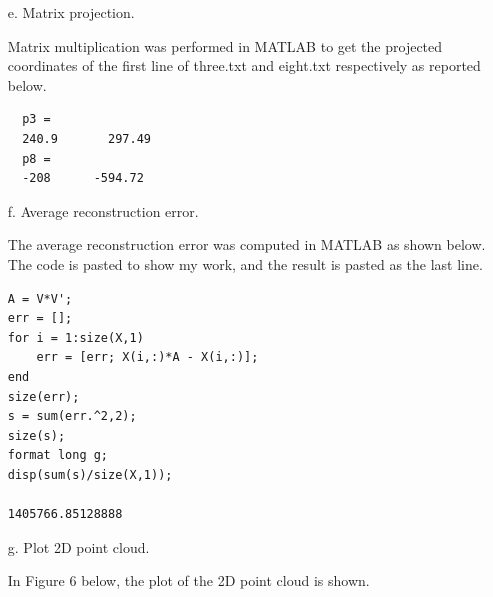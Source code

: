 \documentclass[12pt]{report}
\begin{document}
\begin{enumerate}
\item[e.] Matrix projection.

  Matrix multiplication was performed in MATLAB to get the projected coordinates
  of the first line of three.txt and eight.txt respectively as reported below.

\begin{verbatim}
  p3 =
  240.9       297.49
  p8 =
  -208      -594.72
\end{verbatim}

  \newpage

\item[f.] Average reconstruction error.

  The average reconstruction error was computed in MATLAB as shown below. The
  code is pasted to show my work, and the result is pasted as the last line.

\begin{verbatim}
A = V*V';
err = [];
for i = 1:size(X,1)
    err = [err; X(i,:)*A - X(i,:)];
end
size(err);
s = sum(err.^2,2);
size(s);
format long g;
disp(sum(s)/size(X,1));

1405766.85128888
\end{verbatim}

  \newpage

\item[g.] Plot 2D point cloud.

  In Figure 6 below, the plot of the 2D point cloud is shown.
  \begin{figure}[H]
    \centering {}
  \end{figure}


\end{enumerate}
\end{document}
